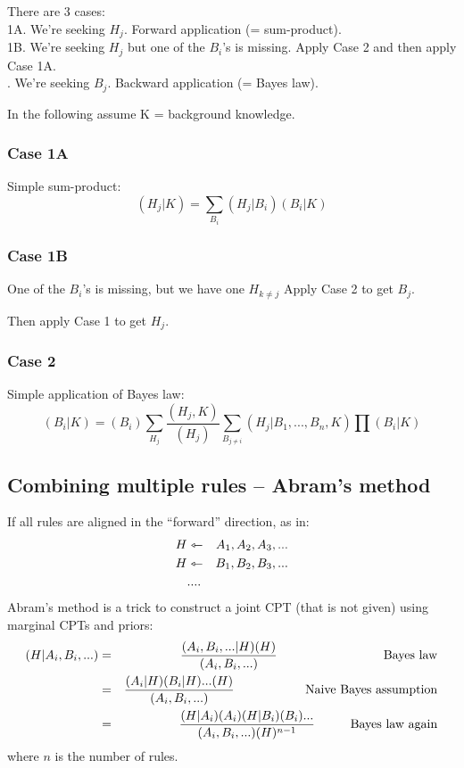 There are 3 cases:\\
\tab 1A. We're seeking $H_j$.  Forward application (= sum-product).\\
\tab 1B. We're seeking $H_j$ but one of the $B_i$'s is missing.  Apply Case 2 and
    then apply Case 1A.\\
. We're seeking $B_j$.  Backward application (= Bayes law).

In the following assume K = background knowledge.

\subsubsection{Case 1A}

Simple sum-product:
$$ (H_j|K) = \sum_{B_i} (H_j|B_i)(B_i|K) $$

\subsubsection{Case 1B}

One of the $B_i$'s is missing, but we have one $H_{k \neq j}$  Apply Case 2 to get $B_j$.

Then apply Case 1 to get $H_j$.

\subsubsection{Case 2}

Simple application of Bayes law:
$$ (B_i|K) = (B_i) \sum_{H_j} \frac{(H_j,K)}{(H_j)}
               \sum_{B_{j \neq i}} (H_j|B_1,...,B_n,K) \prod (B_i|K) $$

\subsection{Combining multiple rules -- Abram's method}

If all rules are aligned in the ``forward'' direction, as in:
\begin{eqnarray}
H &\leftarrowtriangle& A_1, A_2, A_3, ... \nonumber \\
H &\leftarrowtriangle& B_1, B_2, B_3, ... \nonumber \\
  & .... &                    \nonumber
\end{eqnarray}
Abram's method is a trick to construct a joint CPT (that is not given) using marginal CPTs
and priors:
\begin{eqnarray}
(H|A_i,B_i,...) &=& \frac{ (A_i,B_i,...|H)(H) } { (A_i,B_i,...) } \tab\tab\tab \mbox{Bayes law} \nonumber \\
 &=& \frac{ (A_i|H) (B_i|H) ... (H) }{ (A_i,B_i,...) } \tab\tab \mbox{Naive Bayes assumption} \nonumber \\
 &=& \frac{ (H|A_i) (A_i) (H|B_i) (B_i) ... }{ (A_i,B_i,...) (H)^{n-1} } \tab \mbox{Bayes law again} \nonumber
\end{eqnarray}
where $n$ is the number of rules.

